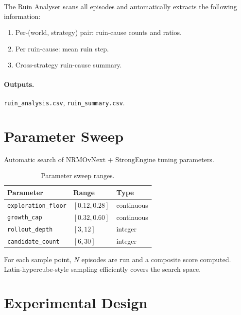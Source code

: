The Ruin Analyser scans all episodes and automatically extracts the
following information:

\begin{enumerate}
\item Per-(world, strategy) pair: ruin-cause counts and ratios.
\item Per ruin-cause: mean ruin step.
\item Cross-strategy ruin-cause summary.
\end{enumerate}

\paragraph{Outputs.}
\texttt{ruin\_analysis.csv}, \texttt{ruin\_summary.csv}.

\section{Parameter Sweep}
\label{sec:vnext-parameter-sweep}

Automatic search of NRMOvNext + StrongEngine tuning parameters.

\begin{table}[ht]
\centering
\small
\begin{tabularx}{\linewidth}{lXX}
\toprule
\textbf{Parameter} & \textbf{Range} & \textbf{Type} \\
\midrule
\texttt{exploration\_floor} & $[0.12, 0.28]$ & continuous \\
\texttt{growth\_cap} & $[0.32, 0.60]$ & continuous \\
\texttt{rollout\_depth} & $[3, 12]$ & integer \\
\texttt{candidate\_count} & $[6, 30]$ & integer \\
\bottomrule
\end{tabularx}
\caption[Parameter sweep ranges]{Parameter sweep ranges.}
\label{tab:vnext-sweep}
\end{table}

For each sample point, $N$ episodes are run and a composite score
computed. Latin-hypercube-style sampling efficiently covers the
search space.

\section{Experimental Design}
\label{sec:vnext-experiments}

